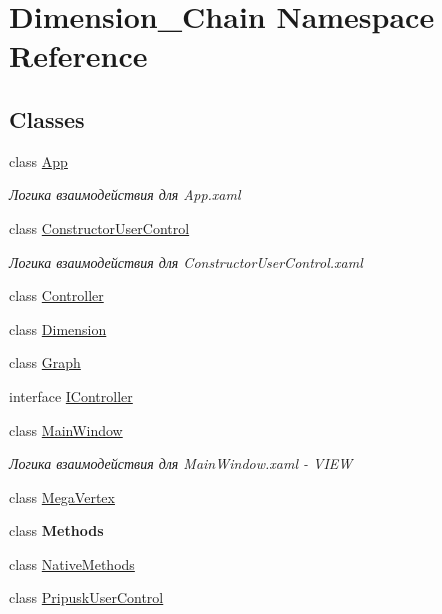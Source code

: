 \hypertarget{namespace_dimension___chain}{}\section{Dimension\+\_\+\+Chain Namespace Reference}
\label{namespace_dimension___chain}
\subsection*{Classes}
\begin{DoxyCompactItemize}
\item 
class \mbox{\hyperlink{class_dimension___chain_1_1_app}{App}}
\begin{DoxyCompactList}\small\item\em Логика взаимодействия для App.\+xaml \end{DoxyCompactList}\item 
class \mbox{\hyperlink{class_dimension___chain_1_1_constructor_user_control}{Constructor\+User\+Control}}
\begin{DoxyCompactList}\small\item\em Логика взаимодействия для Constructor\+User\+Control.\+xaml \end{DoxyCompactList}\item 
class \mbox{\hyperlink{class_dimension___chain_1_1_controller}{Controller}}
\item 
class \mbox{\hyperlink{class_dimension___chain_1_1_dimension}{Dimension}}
\item 
class \mbox{\hyperlink{class_dimension___chain_1_1_graph}{Graph}}
\item 
interface \mbox{\hyperlink{interface_dimension___chain_1_1_i_controller}{I\+Controller}}
\item 
class \mbox{\hyperlink{class_dimension___chain_1_1_main_window}{Main\+Window}}
\begin{DoxyCompactList}\small\item\em Логика взаимодействия для Main\+Window.\+xaml -\/ V\+I\+EW \end{DoxyCompactList}\item 
class \mbox{\hyperlink{class_dimension___chain_1_1_mega_vertex}{Mega\+Vertex}}
\item 
class {\bfseries Methods}
\item 
class \mbox{\hyperlink{class_dimension___chain_1_1_native_methods}{Native\+Methods}}
\item 
class \mbox{\hyperlink{class_dimension___chain_1_1_pripusk_user_control}{Pripusk\+User\+Control}}

\end{DoxyCompactItemize}
